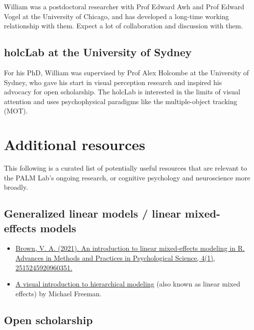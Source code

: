\documentclass[
]{book}
\providecommand{\tightlist}{%
  \setlength{\itemsep}{0pt}\setlength{\parskip}{0pt}}
\begin{document}
William was a postdoctoral researcher with Prof Edward Awh and Prof Edward Vogel at the University of Chicago, and has developed a long-time working relationship with them. Expect a lot of collaboration and discussion with them.

\hypertarget{holclab-at-the-university-of-sydney}{%
\subsection{holcLab at the University of Sydney}\label{holclab-at-the-university-of-sydney}}

For his PhD, William was supervised by Prof Alex Holcombe at the University of Sydney, who gave his start in visual perception research and inspired his advocacy for open scholarship. The holcLab is interested in the limits of visual attention and uses psychophysical paradigms like the multiple-object tracking (MOT).

\hypertarget{extra-resources}{%
\section{Additional resources}\label{extra-resources}}

This following is a curated list of potentially useful resources that are relevant to the PALM Lab's ongoing research, or cognitive psychology and neuroscience more broadly.

\hypertarget{generalized-linear-models-linear-mixed-effects-models}{%
\subsection{Generalized linear models / linear mixed-effects models}\label{generalized-linear-models-linear-mixed-effects-models}}

\begin{itemize}
\tightlist
\item
  \href{https://journals.sagepub.com/doi/full/10.1177/2515245920960351}{Brown, V. A. (2021). An introduction to linear mixed-effects modeling in R. Advances in Methods and Practices in Psychological Science, 4(1), 2515245920960351.}
\item
  \href{http://mfviz.com/hierarchical-models/}{A visual introduction to hierarchical modeling} (also known as linear mixed effects) by Michael Freeman.
\end{itemize}

\hypertarget{open-scholarship}{%
\subsection{Open scholarship}\label{open-scholarship}}
\end{document}
